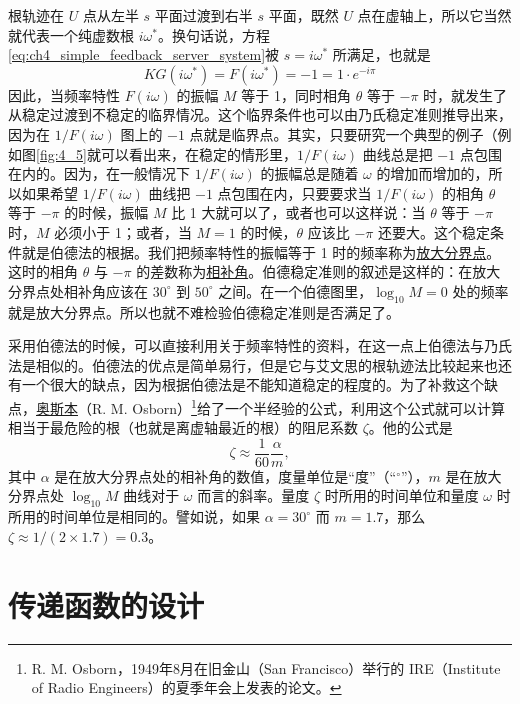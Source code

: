 根轨迹在 $U$ 点从左半 $s$ 平面过渡到右半 $s$ 平面，既然 $U$ 点在虚轴上，所以它当然就代表一个纯虚数根 $i\omega^*$。换句话说，方程\eqref{eq:ch4_simple_feedback_server_system}被 $s=i\omega^*$ 所满足，也就是
\begin{equation*}
KG(i\omega^*) = F(i\omega^*) = -1 = 1 \cdot e^{-i\pi}
\end{equation*}
因此，当频率特性 $F(i\omega)$ 的振幅 $M$ 等于 1，同时相角 $\theta$ 等于 $-\pi$ 时，就发生了从稳定过渡到不稳定的临界情况。这个临界条件也可以由乃氏稳定准则推导出来，因为在 $1/F(i\omega)$ 图上的 $-1$ 点就是临界点。其实，只要研究一个典型的例子（例如图\ref{fig:4_5}就可以看出来，在稳定的情形里，$1/F(i\omega)$ 曲线总是把 $-1$ 点包围在内的。因为，在一般情况下 $1/F(i\omega)$ 的振幅总是随着 $\omega$ 的增加而增加的，所以如果希望 $1/F(i\omega)$ 曲线把 $-1$ 点包围在内，只要要求当 $1/F(i\omega)$ 的相角 $\theta$ 等于 $-\pi$ 的时候，振幅 $M$ 比 1 大就可以了，或者也可以这样说：当 $\theta$ 等于 $-\pi$ 时，$M$ 必须小于 1；或者，当 $M=1$ 的时候，$\theta$ 应该比 $-\pi$ 还要大。这个稳定条件就是伯德法的根据。我们把频率特性的振幅等于 1 时的频率称为\underline{放大分界点}。这时的相角 $\theta$ 与 $-\pi$ 的差数称为\underline{相补角}。伯德稳定准则的叙述是这样的：在放大分界点处相补角应该在 $30^\circ$ 到 $50^\circ$ 之间。在一个伯德图里，$\log_{10}M=0$ 处的频率就是放大分界点。所以也就不难检验伯德稳定准则是否满足了。

采用伯德法的时候，可以直接利用关于频率特性的资料，在这一点上伯德法与乃氏法是相似的。伯德法的优点是简单易行，但是它与艾文思的根轨迹法比较起来也还有一个很大的缺点，因为根据伯德法是不能知道稳定的程度的。为了补救这个缺点，\underline{奥斯本}（R. M. Osborn）\footnote{R. M. Osborn，1949年8月在旧金山（San Francisco）举行的 IRE（Institute of Radio Engineers）的夏季年会上发表的论文。}给了一个半经验的公式，利用这个公式就可以计算相当于最危险的根（也就是离虚轴最近的根）的阻尼系数 $\zeta$。他的公式是
\begin{equation}
\zeta \approx \frac{1}{60} \frac{\alpha}{m},
\end{equation}
其中 $\alpha$ 是在放大分界点处的相补角的数值，度量单位是“度”（“$^\circ$”），$m$ 是在放大分界点处 $\log_{10}M$ 曲线对于 $\omega$ 而言的斜率。量度 $\zeta$ 时所用的时间单位和量度 $\omega$ 时所用的时间单位是相同的。譬如说，如果 $\alpha=30^\circ$ 而 $m=1.7$，那么 $\zeta \approx 1/(2 \times 1.7)=0.3$。

\section{传递函数的设计}

